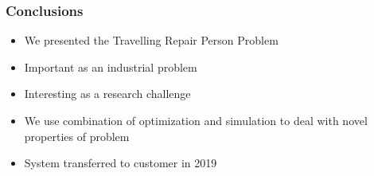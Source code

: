 \begin{frame}
\frametitle{Conclusions}
\begin{itemize}
\item We presented the Travelling Repair Person Problem
\item Important as an industrial problem
\item Interesting as a research challenge
\item We use combination of optimization and simulation to deal with novel properties of problem
\item System transferred to customer in 2019
\end{itemize}
\end{frame}
